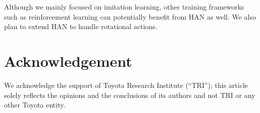 \documentclass[letterpaper, 10 pt, conference]{ieeeconf}
\newcommand{\algoName}{HAN\xspace}
\begin{document}
Although we mainly focused on imitation learning, other training frameworks such as reinforcement learning can potentially benefit from \algoName as well. We also plan to extend \algoName to handle rotational actions.

\section{Acknowledgement}

We acknowledge the support of Toyota Research Institute (``TRI''); this article solely reflects the opinions and the conclusions of its authors and not TRI or any other Toyota entity.
\begin{flushright}
\printbibliography
\end{flushright}
\end{document}
